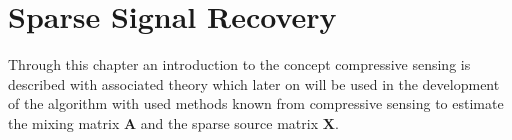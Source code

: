 \chapter{Sparse Signal Recovery}
Through this chapter an introduction to the concept compressive sensing is described with associated theory which later on will be used in the development of the algorithm with used methods known from compressive sensing to estimate the mixing matrix $\mathbf{A}$ and the sparse source matrix $\mathbf{X}$.





